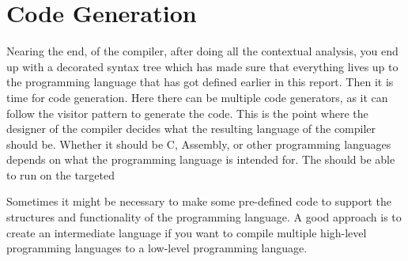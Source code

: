 \section{Code Generation}
Nearing the end, of the compiler, after doing all the contextual analysis, you end up with a decorated syntax tree which has made sure that everything lives up to the programming language that has got defined earlier in this report. Then it is time for code generation.
Here there can be multiple code generators, as it can follow the visitor pattern to generate the code. This is the point where the designer of the compiler decides what the resulting language of the compiler should be. Whether it should be C, Assembly, or other programming languages depends on what the programming language is intended for. The should be able to run on the targeted 


Sometimes it might be necessary to make some pre-defined code to support the structures and functionality of the programming language.
A good approach is to create an intermediate language if you want to compile multiple high-level programming languages to a low-level programming language.



